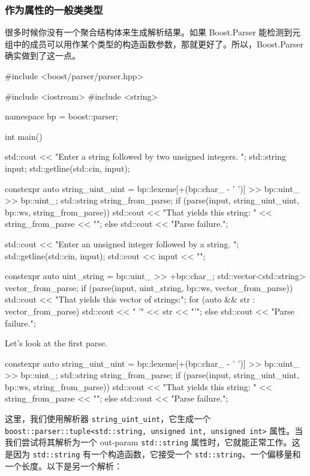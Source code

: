 \subsubsection{作为属性的一般类类型}

很多时候你没有一个聚合结构体来生成解析结果。如果 Boost.Parser 能检测到元组中的成员可以用作某个类型的构造函数参数，那就更好了。所以，Boost.Parser 确实做到了这一点。

\begin{code}
#include <boost/parser/parser.hpp>

#include <iostream>
#include <string>


namespace bp = boost::parser;

int main()
{
    std::cout << "Enter a string followed by two unsigned integers. ";
    std::string input;
    std::getline(std::cin, input);

    constexpr auto string_uint_uint =
        bp::lexeme[+(bp::char_ - ' ')] >> bp::uint_ >> bp::uint_;
    std::string string_from_parse;
    if (parse(input, string_uint_uint, bp::ws, string_from_parse))
        std::cout << "That yields this string: " << string_from_parse << "\n";
    else
        std::cout << "Parse failure.\n";

    std::cout << "Enter an unsigned integer followed by a string. ";
    std::getline(std::cin, input);
    std::cout << input << "\n";

    constexpr auto uint_string = bp::uint_ >> +bp::char_;
    std::vector<std::string> vector_from_parse;
    if (parse(input, uint_string, bp::ws, vector_from_parse)) {
        std::cout << "That yields this vector of strings:\n";
        for (auto && str : vector_from_parse) {
            std::cout << "  '" << str << "'\n";
        }
    } else {
        std::cout << "Parse failure.\n";
    }
}
\end{code}

Let's look at the first parse.

\begin{code}
constexpr auto string_uint_uint =
    bp::lexeme[+(bp::char_ - ' ')] >> bp::uint_ >> bp::uint_;
std::string string_from_parse;
if (parse(input, string_uint_uint, bp::ws, string_from_parse))
    std::cout << "That yields this string: " << string_from_parse << "\n";
else
    std::cout << "Parse failure.\n";
\end{code}

这里，我们使用解析器 \texttt{string\_uint\_uint}，它生成一个 \texttt{boost::parser::tuple<std::string, unsigned int, unsigned int>} 属性。当我们尝试将其解析为一个 out-param \texttt{std::string} 属性时，它就能正常工作。这是因为 \texttt{std::string} 有一个构造函数，它接受一个 \texttt{std::string}、一个偏移量和一个长度。以下是另一个解析：

